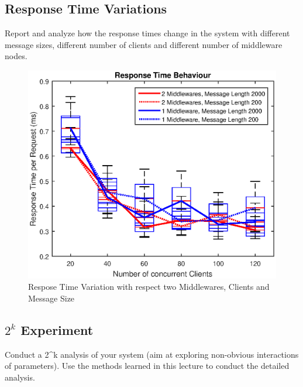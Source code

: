 \documentclass[11pt]{article}
\begin{document}
\subsection{Response Time Variations}\label{sec:response-time-variations}

Report and analyze how the response times change in the system with
different message sizes, different number of clients and different
number of middleware nodes.
\begin{figure}[!htb]
\centering
\includegraphics[width=0.7\linewidth]{figures/rt_experiment}
\caption{Respose Time Variation with respect two Middlewares, Clients and Message Size}
\label{fig:rt_experiment}
\end{figure}


\subsection{$2^k$ Experiment}\label{sec:k-experiment}

Conduct a 2\^{}k analysis of your system (aim at exploring non-obvious
interactions of parameters). Use the methods learned in this lecture to
conduct the detailed analysis.
\end{document}
